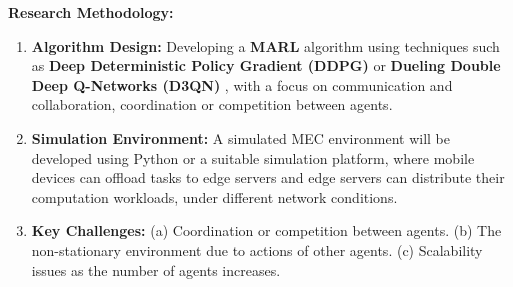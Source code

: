 \documentclass[12pt]{article}
\begin{document}
\noindent\textbf{\large Research Methodology: }
\begin{enumerate} 
	\item \textbf{Algorithm Design:} Developing a \textbf{MARL} algorithm using techniques such as \textbf{Deep Deterministic Policy Gradient (DDPG)} \cite{lillicrap2015continuous} or \textbf{Dueling Double Deep Q-Networks (D3QN)} \cite{van2016deep}, with a focus on communication and collaboration, coordination or competition between agents. \vspace{-1mm}
	\item \textbf{Simulation Environment:} A simulated MEC environment will be developed using Python or a suitable simulation platform, where mobile devices can offload tasks to edge servers and edge servers can distribute their computation workloads, under different network conditions.\vspace{-1mm}
	\item \textbf{Key Challenges:} (a) Coordination or competition between agents. (b) The non-stationary environment due to actions of other agents.  (c) Scalability issues as the number of agents increases.
\end{enumerate}




\end{document}
